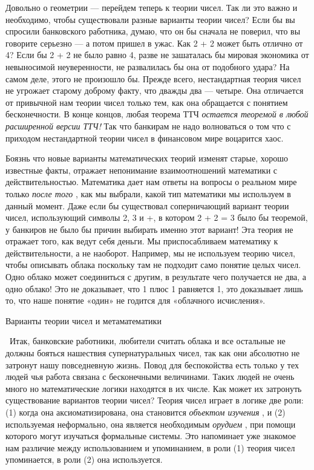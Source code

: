 \documentclass[../main.tex]{subfiles}
\begin{document}
Довольно о геометрии --- перейдем теперь к теории чисел. Так ли это важно и необходимо, чтобы существовали разные варианты теории чисел? Если бы вы спросили банковского работника, думаю, что он бы сначала не поверил, что вы говорите серьезно --- а потом пришел в ужас. Как 2 + 2 может быть отлично от 4? Если бы 2 + 2 не было равно 4, разве не зашаталась бы мировая экономика от невыносимой неуверенности, не развалилась бы она от подобного удара? На самом деле, этого не произошло бы. Прежде всего, нестандартная теория чисел не угрожает старому доброму факту, что дважды два --- четыре. Она отличается от привычной нам теории чисел только тем, как она обращается с понятием бесконечности. В конце концов, любая теорема ТТЧ \emph{остается теоремой в любой расширенной версии ТТЧ!} Так что банкирам не надо волноваться о том что с приходом нестандартной теории чисел в финансовом мире воцарится хаос.

Боязнь что новые варианты математических теорий изменят старые, хорошо известные факты, отражает непонимание взаимоотношений математики с действительностью. Математика дает нам ответы на вопросы о реальном мире только \emph{после того} , как мы выбрали, какой тип математики мы используем в данный момент. Даже если бы существовал соперничающий вариант теории чисел, использующий символы 2, 3 и +, в котором 2 + 2 = 3 было бы теоремой, у банкиров не было бы причин выбирать именно этот вариант! Эта теория не отражает того, как ведут себя деньги. Мы приспосабливаем математику к действительности, а не наоборот. Например, мы не используем теорию чисел, чтобы описывать облака поскольку там не подходит само понятие целых чисел. Одно облако может соединиться с другим, в результате чего получается не два, а одно облако! Это не доказывает, что 1 плюс 1 равняется 1, это доказывает лишь то, что наше понятие «один» не годится для «облачного исчисления».

Варианты теории чисел и метаматематики

~Итак, банковские работники, любители считать облака и все остальные не должны бояться нашествия супернатуральных чисел, так как они абсолютно не затронут нашу повседневную жизнь. Повод для беспокойства есть только у тех людей чья работа связана с бесконечными величинами. Таких людей не очень много но математические логики находятся в их числе. Как может их затронуть существование вариантов теории чисел? Теория чисел играет в логике две роли: (1) когда она аксиоматизирована, она становится \emph{объектом изучения} , и (2) используемая неформально, она является необходимым \emph{орудием} , при помощи которого могут изучаться формальные системы. Это напоминает уже знакомое нам различие между использованием и упоминанием, в роли (1) теория чисел упоминается, в роли (2) она используется.
\end{document}
